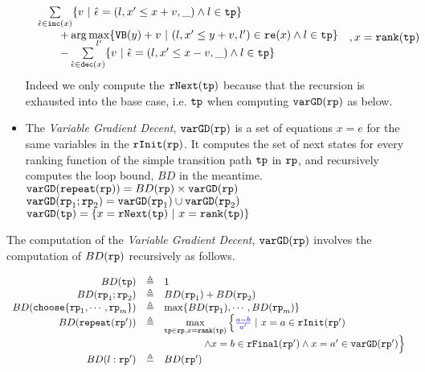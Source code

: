 \begin{defn}
\begin{itemize}
\[\begin{array}{l}
\begin{array}{l}
  \sum\limits_{\absevent \in \inc(x) }
   \left\{ v ~\middle\vert~ \absevent = (l, x' \leq x + v, \_) \land l \in \tpath\right\}
   \\ \qquad 
   + \arg\max\limits_{l' }
      \left\{ \varinvar(y) + v ~\middle\vert~ (l, x' \leq y + v, l') \in \reset(x) \land l \in \tpath\right\}
      \\ \qquad 
     - \sum\limits_{ \absevent \in \dec(x) }\left\{ 
       v ~\middle\vert~ \absevent = (l, x' \leq x - v, \_) \land l \in \tpath 
       \right\}
     \end{array}
   \end{array}
   , x = \locbound(\tpath)
 \]
 Indeed we only compute the $\mathtt{rNext}(\mathtt{tp})$ because that the recursion is exhausted into the base case, i.e. $\mathtt{tp}$ when computing $\mathtt{varGD}(\mathtt{rp})$ as below.
 \item  The \emph{Variable Gradient Decent}, 
 $\mathtt{varGD}(\mathtt{rp})$
 is a set of equations $x = e$ for the same variables in the $\mathtt{rInit}(\mathtt{rp})$.
 It computes the set of next states for every ranking function of the simple transition path $\mathtt{tp}$ in $\mathtt{rp}$,
 and recursively computes the loop bound, $BD$ in the meantime.
 \\
 {$\mathtt{varGD}(\mathtt{repeat}(\mathtt{rp})) =  BD(\mathtt{rp})  \times
{\ensuremath{\mathtt{varGD}}(\ensuremath{\mathtt{rp}})}$}
 \\
 $\mathtt{varGD}(\mathtt{rp}_1;\mathtt{rp}_2) =  \mathtt{varGD}(\mathtt{rp}_1) \cup \mathtt{varGD}(\mathtt{rp}_2)$
 \\
 $\varGD(\tpath) =  \left\{x = \rfnext(\tpath) ~|~ x = \locbound(\tpath) \right\} $  
\end{itemize}
\end{defn}
The computation of the \emph{Variable Gradient Decent}, 
$\mathtt{varGD}(\mathtt{rp})$ involves the computation of $BD(\mathtt{rp})$ recursively as follows.
\begin{defn}
  \label{def:loopbound}
  \[
    \begin{array}{rcl}
      BD(\tpath) & \triangleq & 1 \\
      BD(\rprog_1;\rprog_2) & \triangleq & BD(\rprog_1) + BD(\rprog_2) \\
      BD(\rpchoose{\rprog_1, \cdots, \rprog_m }) & \triangleq 
      & \max\left\{ BD(\rprog_1), \cdots, BD(\rprog_m) \right\} \\
      BD(\rprepeat(\rprog')) & \triangleq 
      &
      \max\limits_{\tpath \in \rprog, x = \locbound(\tpath)}
      \Big\{ \highlight{\frac{a - b}{a'}} ~\vert~
      x = a \in \rfinit(\rprog')
      \\ & & \qquad \qquad
      \land x = b \in \rffinal(\rprog')
      \land x = a' \in \varGD(\rprog')
       \Big\} 
       \\
      BD(l: \rprog') & \triangleq & BD(\rprog')
    \end{array}
    \]
  \end{defn}

